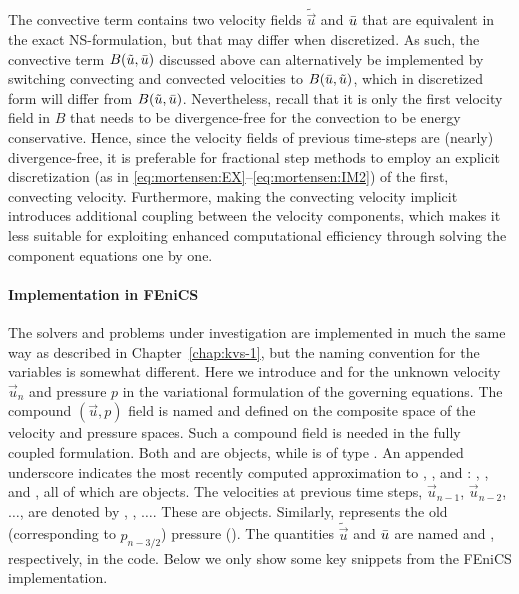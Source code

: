 The convective term contains two velocity fields $\tilde{\vec{u}}$
and $\Bar{\vec{u}}$ that are equivalent in the exact NS-formulation,
but that may differ when discretized. As such, the convective term
$B(\tilde{\vec{u}},\Bar{\vec{u}})$ discussed above can alternatively
be implemented by switching convecting and convected velocities to
$B(\Bar{\vec{u}},\tilde{\vec{u}})$, which in discretized form will
differ from $B(\tilde{\vec{u}},\Bar{\vec{u}})$. Nevertheless, recall
that it is only the first velocity field in $B$ that needs to be
divergence-free for the convection to be energy conservative.
Hence, since the velocity fields
of previous time-steps are (nearly) divergence-free, it is preferable
for fractional step methods to employ an explicit discretization (as
in \eqref{eq:mortensen:EX}--\eqref{eq:mortensen:IM2}) of the first,
convecting velocity. Furthermore, making the convecting velocity implicit
introduces additional coupling between the velocity components, which
makes it less suitable for exploiting enhanced computational efficiency
through solving the component equations one by one.

\paragraph{Implementation in FEniCS}
\label{sec:mortensen:impl_fenics}

The solvers and problems under investigation are implemented in much
the same way as described in Chapter~\ref{chap:kvs-1}, but the naming
convention for the variables is somewhat different. Here we introduce
 and  for the unknown velocity $\vec{u}_n$ and pressure
$p$ in the variational formulation of the governing equations. The
compound $(\vec{u},p)$ field is named  and defined on the
composite space of the velocity and pressure spaces. Such a compound
field is needed in the fully coupled formulation.  Both  and
 are  objects, while  is of type
.  An appended underscore indicates the most recently
computed approximation to , , and : ,
, and , all of which are  objects. The
velocities at previous time steps, $\vec{u}_{n-1}$, $\vec{u}_{n-2}$,
$\ldots$, are denoted by , , $\ldots$. These
are  objects. Similarly,  represents the old
(corresponding to $p_{n-3/2}$) pressure (). The quantities
$\tilde{\vec{u}}$ and $\Bar{\vec{u}}$ are named  and
, respectively, in the code. Below we only show some key
snippets from the FEniCS implementation.

